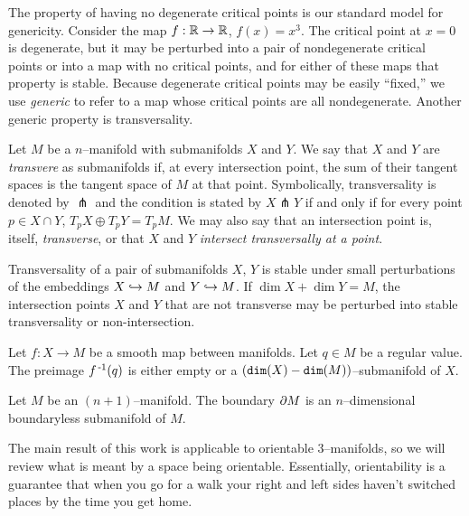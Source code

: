 The property of having no degenerate critical points is our standard model for genericity.
Consider the map $f:\mathbb{R}\to\mathbb{R}$, $f(x)=x^3$.
The critical point at $x=0$ is degenerate, but it may be perturbed into a pair of nondegenerate critical points or into a map with no critical points, and for either of these maps that property is stable.
Because degenerate critical points may be easily ``fixed,'' we use \emph{generic} to refer to a map whose critical points are all nondegenerate.
Another generic property is transversality.

\begin{defn}
	Let $M$ be a $n$--manifold with submanifolds $X$ and $Y$.
	We say that $X$ and $Y$ are \emph{transvere} as submanifolds if, at every intersection point, the sum of their tangent spaces is the tangent space of $M$ at that point.
	Symbolically, transversality is denoted by $\pitchfork$ and the condition is stated by $X\pitchfork Y$ if and only if for every point $p\in X\cap Y$, $T_p X\oplus T_p Y=T_p M$.
	We may also say that an intersection point is, itself, \emph{transverse}, or that $X$ and $Y$ \emph{intersect transversally at a point}.	
\end{defn}

Transversality of a pair of submanifolds $X$, $Y$ is stable under small perturbations of the embeddings $X\hookrightarrow M$ and $Y\hookrightarrow M$.
If $\dim X + \dim Y = M$, the intersection points $X$ and $Y$ that are not transverse may be perturbed into stable transversality or non-intersection.

\begin{theorem}
	Let $f:X\to M$ be a smooth map between manifolds.
	Let $q\in M$ be a regular value.
	The preimage $f^{\,\text{-}1}(q)$ is either empty or a $(\texttt{dim}(X)-\texttt{dim}(M))$--submanifold of $X$.
\end{theorem}

\begin{prop}
	\label{prop:boundariesaremanifolds}
	Let $M$ be an $(n+1)$--manifold.
	The boundary $\partial M$ is an $n$--dimensional boundaryless submanifold of $M$.
\end{prop}

The main result of this work is applicable to orientable 3--manifolds, so we will review what is meant by a space being orientable.
Essentially, orientability is a guarantee that when you go for a walk your right and left sides haven't switched places by the time you get home.

